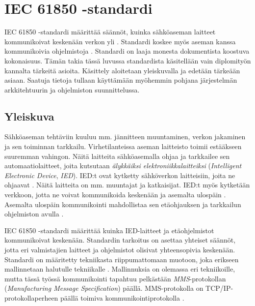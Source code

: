 \chapter{IEC 61850 -standardi}
\label{ch:iec61850-theory}
IEC 61850 -standardi määrittää säännöt, kuinka sähköaseman laitteet kommunikoivat keskenään verkon yli \cite[s.~1]{Kaneda2008}. Standardi koskee myös aseman kanssa kommunikoivia ohjelmistoja \cite[s.~10]{IEC61850-7-1}. Standardi on laaja monesta dokumentista koostuva kokonaisuus. Tämän takia tässä luvussa standardista käsitellään vain diplomityön kannalta tärkeitä asioita. Käsittely aloitetaan yleiskuvalla ja edetään tärkeään asiaan. Saatuja tietoja tullaan käyttämään myöhemmin pohjana järjestelmän arkkitehtuurin ja ohjelmiston suunnittelussa.


\section{Yleiskuva}
Sähköaseman tehtäviin kuuluu mm. jännitteen muuntaminen, verkon jakaminen ja sen toiminnan tarkkailu. Virhetilanteissa aseman laitteisto toimii estääkseen suuremman vahingon. Näitä laitteita sähköasemalla ohjaa ja tarkkailee sen automaatiolaitteet, joita kutsutaan \emph{älykkäiksi elektroniikkalaitteiksi} (\emph{Intelligent Electronic Device}, \emph{IED}). IED:t ovat kytketty sähköverkon laitteisiin, joita ne ohjaavat \cite[s.~63--64]{IEC61850-7-1}. Näitä laitteita on mm. muuntajat ja katkaisijat. IED:t myös kytketään verkkoon, jotta ne voivat kommunikoida keskenään ja asemalta ulospäin \cite[s.~31]{IEC61850-7-1}. Asemalta ulospäin kommunikointi mahdollistaa sen etäohjauksen ja tarkkailun ohjelmiston avulla \cite[s.~1]{Brunner2008}.

IEC 61850 -standardi määrittää kuinka IED-laitteet ja etäohjelmistot kommunikoivat keskenään. Standardin tarkoitus on asettaa yhteiset säännöt, jotta eri valmistajien laitteet ja ohjelmistot olisivat yhteensopivia keskenään. Standardi on määritetty tekniikasta riippumattomaan muotoon, joka erikseen mallinnetaan halutulle tekniikalle \cite{IEC61850-1}. Mallinnuksia on olemassa eri tekniikoille, mutta tässä työssä kommunikointi tapahtuu pelkästään \emph{MMS}-protokollan (\emph{Manufacturing Message Specification}) päällä. MMS-protokolla on TCP/IP-protokollaperheen päällä toimiva kommunikointiprotokolla \cite{MMS-protocol-stack-and-API}.

